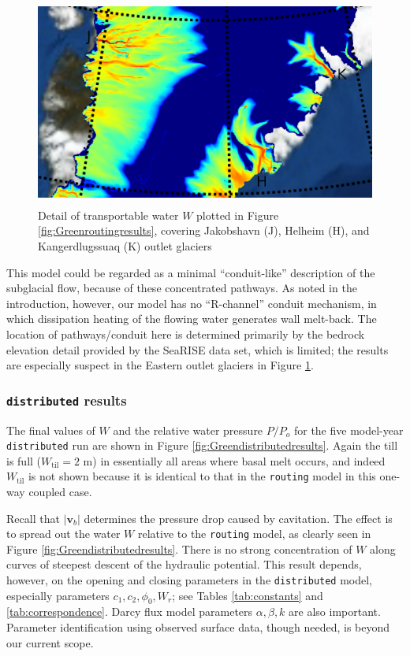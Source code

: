 \documentclass[gmd]{copernicus}   %
\newcommand{\text}{\textrm}
\newcommand\bv{\mathbf{v}}
\newcommand{\Wtil}{W_{\text{til}}}
\begin{document}
\begin{figure}[ht]
\includegraphics[height=2.7in,keepaspectratio=true]{detail-routing-decoupled-bwat}
\caption{Detail of transportable water $W$ plotted in Figure \ref{fig:Greenroutingresults}, covering Jakobshavn (J), Helheim (H), and Kangerdlugssuaq (K) outlet glaciers}
\label{fig:Greenroutingdetail}
\end{figure}

This model could be regarded as a minimal ``conduit-like'' description of the subglacial flow, because of these concentrated pathways.  As noted in the introduction, however, our model has no ``R-channel'' conduit mechanism, in which dissipation heating of the flowing water generates wall melt-back.  The location of pathways/conduit here is determined primarily by the bedrock elevation detail provided by the SeaRISE data set, which is limited; the results are especially suspect in the Eastern outlet glaciers in Figure \ref{fig:Greenroutingdetail}.

\subsubsection{\texttt{distributed} results}  The final values of $W$ and the relative water pressure $P/P_o$ for the five model-year \texttt{distributed} run are shown in Figure \ref{fig:Greendistributedresults}.  Again the till is full ($\Wtil=2$ m) in essentially all areas where basal melt occurs, and indeed $\Wtil$ is not shown because it is identical to that in the \texttt{routing} model in this one-way coupled case.

Recall that $|\bv_b|$ determines the pressure drop caused by cavitation.  The effect is to spread out the water $W$ relative to the \texttt{routing} model, as clearly seen in Figure \ref{fig:Greendistributedresults}.  There is no strong concentration of $W$ along curves of steepest descent of the hydraulic potential.  This result depends, however, on the opening and closing parameters in the \texttt{distributed} model, especially parameters $c_1,c_2,\phi_0,W_r$; see Tables \ref{tab:constants} and \ref{tab:correspondence}.  Darcy flux model parameters $\alpha,\beta,k$ are also important.  Parameter identification using observed surface data, though needed, is beyond our current scope.
\end{document}
